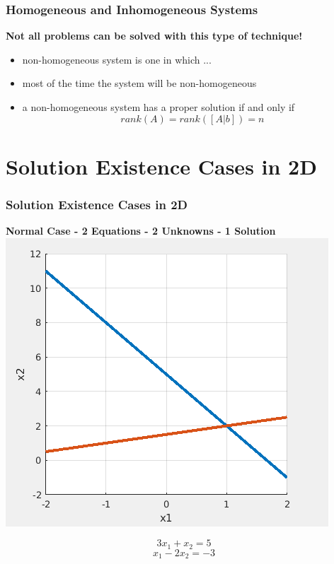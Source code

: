 \documentclass[fleqn]{beamer} %
\newcommand{\sectiontitleII}{Homogeneous and Inhomogeneous Systems}
\newcommand{\sectiontitleIII}{Solution Existence Cases in 2D}
\begin{document}
\begin{frame}[label=sectionII] \small 
  \frametitle{\sectiontitleII}
	 \textbf{ Not all problems can be solved with this type of technique!} \\	
	\begin{itemize}
		\item {\PR non-homogeneous} system is one in which ... \vspace{10mm}\\
		\item most of the time the system will be {\PR non-homogeneous} \vspace{10mm}\\
		\item a {\PR non-homogeneous} system has a {\BL proper solution} if and only if\vspace{2mm}\\
		\[rank(A)=rank([A | b])=n\]
	\end{itemize}
  
\end{frame}

\section{\sectiontitleIII}

\begin{frame}[label=sectionIII] \small 
  \frametitle{\sectiontitleIII}
  {\bf Normal Case - 2 Equations - 2 Unknowns - 1 Solution} \\ \vspace{2mm}
  \includegraphics[scale=.3]{lecture5_fig1.png} \\
  \begin{fleqn}
\[3x_1+x_2=5\]
\[x_1-2x_2=-3\]
  \end{fleqn}
\end{frame}
  
\end{document}
